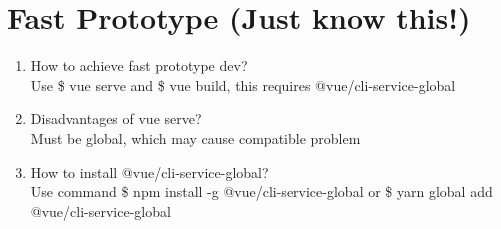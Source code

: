 \documentclass[10pt,a4paper,oneside]{article}
\begin{document}
\section{Fast Prototype (Just know this!)}
\begin{enumerate}[1.]
\item  How to achieve fast prototype dev?  \\
Use \$ vue serve and \$ vue build, this requires @vue/cli-service-global
\item  Disadvantages of vue serve?  \\
Must be global, which may cause compatible problem
\item  How to install @vue/cli-service-global?  \\
Use command \$ npm install -g @vue/cli-service-global or \$ yarn global add @vue/cli-service-global
\end{enumerate}
\end{document}
